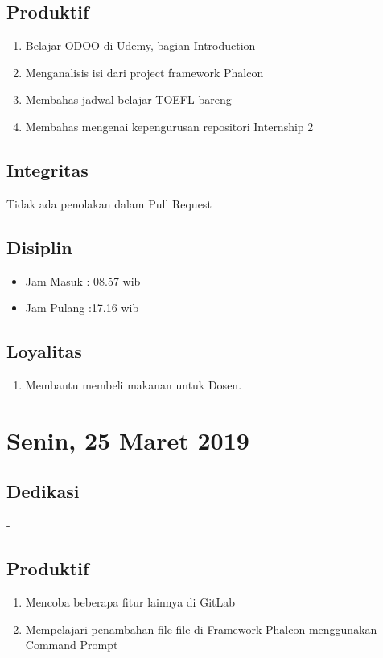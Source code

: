 \subsection{Produktif}
\begin{enumerate}
\item Belajar ODOO di Udemy, bagian Introduction
\item Menganalisis isi dari project framework Phalcon
\item Membahas jadwal belajar TOEFL bareng
\item Membahas mengenai kepengurusan repositori Internship 2
\end{enumerate}
\subsection{Integritas}
Tidak ada penolakan dalam Pull Request
\subsection{Disiplin}
\begin{itemize}
\item Jam Masuk : 08.57 wib
\item Jam Pulang :17.16 wib
\end{itemize}
\subsection{Loyalitas}
\begin{enumerate}
\item Membantu membeli makanan untuk Dosen.
\end{enumerate}

\section{Senin, 25 Maret 2019}
\subsection{Dedikasi}
-
\subsection{Produktif}
\begin{enumerate}
\item Mencoba beberapa fitur lainnya di GitLab
\item Mempelajari penambahan file-file di Framework Phalcon menggunakan Command Prompt
\end{enumerate}
